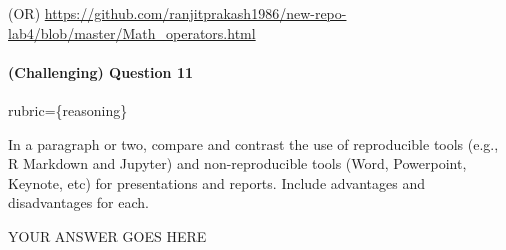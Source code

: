 \documentclass[
]{article}
\begin{document}
(OR)
\url{https://github.com/ranjitprakash1986/new-repo-lab4/blob/master/Math_operators.html}

\begin{alert alert-info}
\hypertarget{challenging-question-11}{%
\paragraph{(Challenging) Question 11}\label{challenging-question-11}}

rubric=\{reasoning\}

In a paragraph or two, compare and contrast the use of reproducible
tools (e.g., R Markdown and Jupyter) and non-reproducible tools (Word,
Powerpoint, Keynote, etc) for presentations and reports. Include
advantages and disadvantages for each.
\end{alert alert-info}

YOUR ANSWER GOES HERE
\end{document}
